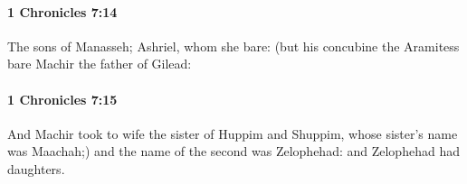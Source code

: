 		\paragraph{1 Chronicles 7:14} %
			\label{1CHRONICLES-7-14}

			The sons of Manasseh; Ashriel, whom she bare: (but his concubine the Aramitess bare Machir the father of Gilead:


		\paragraph{1 Chronicles 7:15} %
			\label{1CHRONICLES-7-15}

			And Machir took to wife the sister of Huppim and Shuppim, whose sister’s name was Maachah;) and the name of the second was Zelophehad: and Zelophehad had daughters.


